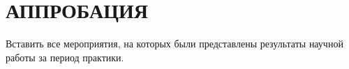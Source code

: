 \chapter*{АППРОБАЦИЯ}

Вставить все мероприятия, на которых были представлены результаты научной работы за период практики.